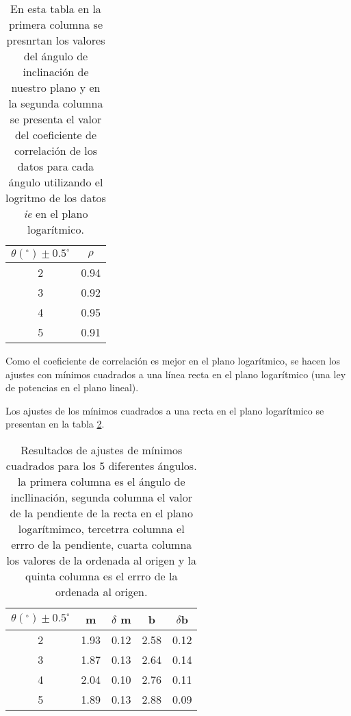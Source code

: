 \documentclass[12pt,letterpaper]{article}
\begin{document}
\begin{table}[!h]
\begin{center}
\begin{tabular}{cc}
\hline 
$\theta (^{\circ}) \pm 0.5 ^{\circ}$ &  $\rho$ \\ 
\hline
\hline 
2 & 0.94 \\ 
 
3 & 0.92 \\ 

4 & 0.95 \\ 

5 & 0.91 \\
\hline 
\end{tabular}
\caption{En esta tabla en la primera columna se presnrtan los valores del ángulo de inclinación de nuestro plano y en la segunda columna se presenta el valor del coeficiente de correlación de los datos para cada ángulo utilizando el logritmo de los datos \textit{ie} en el plano logarítmico.}\label{tl}
\end{center}
\end{table}

Como el coeficiente de correlación es mejor en el plano logarítmico, se hacen los ajustes con mínimos cuadrados a una línea recta en el plano logarítmico (una ley de potencias en el plano lineal).

Los ajustes de los mínimos cuadrados a una recta en el plano logarítmico se presentan en la tabla \ref{tr}.

\begin{table}[!h]
\begin{center}
\begin{tabular}{ccccc}
\hline 
$\theta (^{\circ}) \pm 0.5 ^{\circ}$ &  m & $\delta$ m & b & $\delta$b \\ 
\hline
\hline 
2 & 1.93& 0.12 & 2.58 &  0.12\\ 
 
3 & 1.87& 0.13 & 2.64 & 0.14 \\ 

4 & 2.04& 0.10 & 2.76 & 0.11\\ 

5 & 1.89& 0.13 & 2.88 & 0.09 \\
\hline 
\end{tabular}
\caption{Resultados de ajustes de mínimos cuadrados para los 5 diferentes ángulos. la primera columna es el ángulo de incllinación, segunda columna el valor de la pendiente de la recta en el plano logarítmimco, tercetrra columna el errro de la pendiente, cuarta columna los valores de la ordenada al origen y la quinta columna es el errro de la ordenada al origen.}\label{tr}
\end{center}
\end{table}
\end{document}
